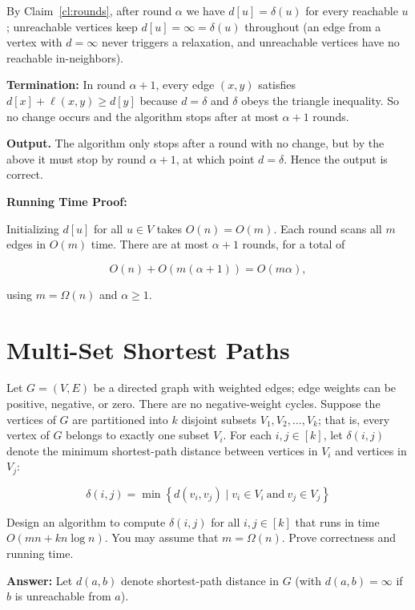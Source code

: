 \documentclass[11pt]{article}
\begin{document}
\medskip

By Claim~\ref{cl:rounds}, after round $\alpha$ we have $d[u] = \delta(u)$ for every reachable $u$; unreachable vertices keep $d[u] = \infty = \delta(u)$ 
throughout (an edge from a vertex with $d = \infty$ never triggers a relaxation, and unreachable vertices have no reachable in-neighbors).

\medskip

\textbf{Termination:} In round $\alpha + 1$, every edge $(x,y)$ satisfies $d[x] + \ell(x,y) \ge d[y]$ because $d = \delta$ and 
$\delta$ obeys the triangle inequality. So no change occurs and the algorithm stops after at most $\alpha+1$ rounds.

\medskip

\textbf{Output.} The algorithm only stops after a round with no change, but by the above it must stop by round $\alpha + 1$, 
at which point $d = \delta$. Hence the output is correct. 

\medskip

\textbf{Running Time Proof:}

Initializing $d[u]$ for all $u \in V$ takes $O(n)=O(m)$. Each round scans all $m$ edges in $O(m)$ time. There are at most $\alpha+1$ rounds, for a total of

$$O(n) +O(m(\alpha+1)) = O(m\alpha),$$

using $m=\Omega(n)$ and $\alpha\ge 1$. 

\section{Multi-Set Shortest Paths}
Let $G = (V, E)$ be a directed graph with weighted edges; edge weights can be positive, negative, or zero. There are no negative-weight cycles. 
Suppose the vertices of $G$ are partitioned into $k$ disjoint subsets $V_1, V_2, \dots, V_k$; that is, 
every vertex of $G$ belongs to exactly one subset $V_i$. For each $i, j \in [k]$, let $\delta(i, j)$ 
denote the minimum shortest-path distance between vertices in $V_i$ and vertices in $V_j$:

$$\delta(i,j) = \min \left\{d(v_i, v_j) \mid v_i \in V_i\ \text{and}\ v_j \in V_j\right\}$$

Design an algorithm to compute $\delta(i,j)$ for all $i,j \in [k]$ that runs in time $O(mn + kn\log n)$. You may assume that $m = \Omega(n)$. 
Prove correctness and running time.

\bigskip

\textbf{Answer:} Let $d(a,b)$ denote shortest-path distance in $G$ (with $d(a,b)=\infty$ if $b$ is unreachable from $a$).
\end{document}
